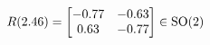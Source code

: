 \documentclass[preview]{standalone}
\begin{document}
\begin{align*}
\special{dvisvgm:raw <g id='unique000'>}R(2.46) = \begin{bmatrix} -0.77 & -0.63 \\ 0.63 & -0.77 \end{bmatrix} \in \text{SO}(2)\special{dvisvgm:raw </g>}
\end{align*}
\end{document}
